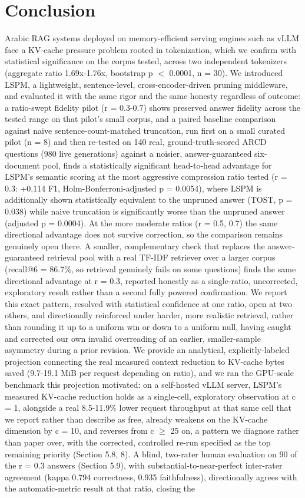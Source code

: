 \section{Conclusion}
Arabic RAG systems deployed on memory-efficient serving engines such as vLLM face a KV-cache pressure problem rooted in tokenization, which we confirm with statistical significance on the corpus tested, across two independent tokenizers (aggregate ratio 1.69x-1.76x, bootstrap p $<$ 0.0001, n = 30). We introduced LSPM, a lightweight, sentence-level, cross-encoder-driven pruning middleware, and evaluated it with the same rigor and the same honesty regardless of outcome: a ratio-swept fidelity pilot (r = 0.3-0.7) shows preserved answer fidelity across the tested range on that pilot's small corpus, and a paired baseline comparison against naive sentence-count-matched truncation, run first on a small curated pilot (n = 8) and then re-tested on 140 real, ground-truth-scored ARCD questions (980 live generations) against a noisier, answer-guaranteed six-document pool, finds a statistically significant head-to-head advantage for LSPM's semantic scoring at the most aggressive compression ratio tested (r = 0.3: +0.114 F1, Holm-Bonferroni-adjusted p = 0.0054), where LSPM is additionally shown statistically equivalent to the unpruned answer (TOST, p = 0.038) while naive truncation is significantly worse than the unpruned answer (adjusted p = 0.0004). At the more moderate ratios (r = 0.5, 0.7) the same directional advantage does not survive correction, so the comparison remains genuinely open there. A smaller, complementary check that replaces the answer-guaranteed retrieval pool with a real TF-IDF retriever over a larger corpus (recall@6 = 86.7\%, so retrieval genuinely fails on some questions) finds the same directional advantage at r = 0.3, reported honestly as a single-ratio, uncorrected, exploratory result rather than a second fully powered confirmation. We report this exact pattern, resolved with statistical confidence at one ratio, open at two others, and directionally reinforced under harder, more realistic retrieval, rather than rounding it up to a uniform win or down to a uniform null, having caught and corrected our own invalid overreading of an earlier, smaller-sample asymmetry during a prior revision. We provide an analytical, explicitly-labeled projection connecting the real measured context reduction to KV-cache bytes saved (9.7-19.1 MiB per request depending on ratio), and we ran the GPU-scale benchmark this projection motivated: on a self-hosted vLLM server, LSPM's measured KV-cache reduction holds as a single-cell, exploratory observation at c = 1, alongside a real 8.5-11.9\% lower request throughput at that same cell that we report rather than describe as free, already weakens on the KV-cache dimension by c = 10, and reverses from c $\geq$ 25 on, a pattern we diagnose rather than paper over, with the corrected, controlled re-run specified as the top remaining priority (Section 5.8, 8). A blind, two-rater human evaluation on 90 of the r = 0.3 answers (Section 5.9), with substantial-to-near-perfect inter-rater agreement (kappa 0.794 correctness, 0.935 faithfulness), directionally agrees with the automatic-metric result at that ratio, closing the 